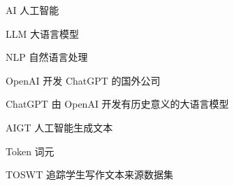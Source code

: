 %
%
%
%

\begin{symbols}
  \item[AI] 人工智能
  \item[LLM] 大语言模型
  \item[NLP] 自然语言处理
  \item[OpenAI] 开发 ChatGPT 的国外公司
  \item[ChatGPT] 由 OpenAI 开发有历史意义的大语言模型
  \item[AIGT] 人工智能生成文本
  \item[Token] 词元
  \item[TOSWT] 追踪学生写作文本来源数据集
\end{symbols}

